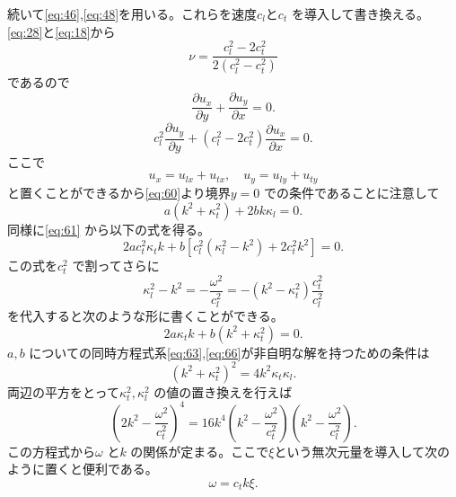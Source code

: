 \documentclass[dvipdfmx]{jsreport}
\numberwithin{equation}{chapter}
\numberwithin{table}{chapter}
\begin{document}
続いて\eqref{eq:46},\eqref{eq:48}を用いる。これらを速度$c_l$と$c_t$ を導入して書き換える。
\eqref{eq:28}と\eqref{eq:18}から
\begin{equation}
\label{eq:59}
	\nu=\frac{c_l^2-2c_t^2}{2(c_l^2-c_t^2)}
\end{equation}
であるので
\begin{equation}
\label{eq:60}
	\frac{\partial u_x}{\partial y} +\frac{\partial u_y}{\partial x} =0
.\end{equation}
\begin{equation}
\label{eq:61}
	c_{l}^2\frac{\partial u_y}{\partial y} +(c_l^2-2c_t^2)\frac{\partial u_x}{\partial x} =0
.\end{equation}
ここで
\begin{equation}
\label{eq:62}
	u_x=u_{lx}+u_{tx},\quad u_{y}=u_{ly}+u_{ty}
\end{equation}
と置くことができるから\eqref{eq:60}より境界$y=0$ での条件であることに注意して
\begin{equation}
\label{eq:63}
	a(k^2+\kappa^2_t)+2bk\kappa_l=0
.\end{equation}
同様に\eqref{eq:61}
から以下の式を得る。
\begin{equation}
\label{eq:64}
	2ac_t^2\kappa_tk+b\left[ c_l^2(\kappa_l^2-k^2)+2c_t^2k^2 \right] =0
.\end{equation}
この式を$c_t^2$ で割ってさらに
\begin{equation}
\label{eq:65}
	\kappa_l^2-k^2=-\frac{\omega^2}{c_l^2}=-(k^2-\kappa_t^2) \frac{c_t^2}{c_l^2}
\end{equation}
を代入すると次のような形に書くことができる。
\begin{equation}
\label{eq:66}
	2a\kappa_tk+b(k^2+\kappa_t^2)=0
.\end{equation}
$a,b$ についての同時方程式系\eqref{eq:63},\eqref{eq:66}が非自明な解を持つための条件は
\begin{equation}
\label{eq:67}
	(k^2+\kappa_t^2)^2=4k^2\kappa_t\kappa_l
.\end{equation}
両辺の平方をとって$\kappa_t^2,\kappa_l^2$ の値の置き換えを行えば
\begin{equation}
\label{eq:68}
\left( 2k^2-\frac{\omega^2}{c_t^2} \right) ^{4}=16k^{4}\left( k^2-\frac{\omega^2}{c_t^2} \right) \left( k^2-\frac{\omega^2}{c_l^2} \right) 
.\end{equation}
この方程式から$\omega$ と$k$ の関係が定まる。ここで$\xi$という無次元量を導入して次のように置くと便利である。
\begin{equation}
\label{eq:69}
	\omega=c_t k\xi
.\end{equation}
\end{document}
